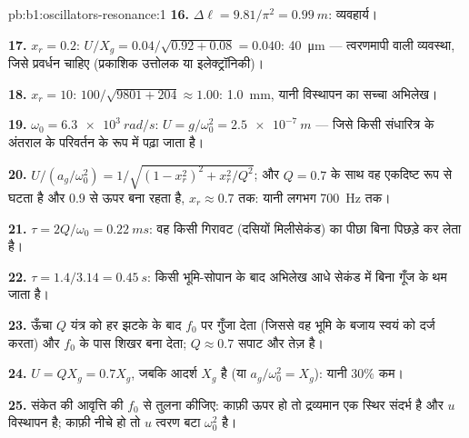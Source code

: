 \begin{solution}{pb:b1:oscillators-resonance:1}
\textbf{16.} $\Delta\ell = 9.81/\pi^2 = \qty{0.99}{m}$: व्यवहार्य।

\textbf{17.} $x_r = 0.2$: $U/X_g = 0.04/\sqrt{0.92 + 0.08} = 0.040$:
\qty{40}{\micro m} --- त्वरणमापी वाली व्यवस्था, जिसे प्रवर्धन चाहिए
(प्रकाशिक उत्तोलक या इलेक्ट्रॉनिकी)।

\textbf{18.} $x_r = 10$: $100/\sqrt{9801 + 204} \approx 1.00$: \qty{1.0}{mm},
यानी विस्थापन का सच्चा अभिलेख।

\textbf{19.} $\omega_0 = \qty{6.3e3}{rad/s}$: $U = g/\omega_0^2 = \qty{2.5e-7}{m}$
--- जिसे किसी संधारित्र के अंतराल के परिवर्तन के रूप में पढ़ा जाता है।

\textbf{20.} $U/(a_g/\omega_0^2) = 1/\sqrt{(1 - x_r^2)^2 + x_r^2/Q^2}$; और
$Q = 0.7$ के साथ वह एकदिष्ट रूप से घटता है और $0.9$ से ऊपर बना रहता है,
$x_r \approx 0.7$ तक: यानी लगभग \qty{700}{Hz} तक।

\textbf{21.} $\tau = 2Q/\omega_0 = \qty{0.22}{ms}$: वह किसी गिरावट (दसियों
मिलीसेकंड) का पीछा बिना पिछड़े कर लेता है।

\textbf{22.} $\tau = 1.4/3.14 = \qty{0.45}{s}$: किसी भूमि-सोपान के बाद
अभिलेख आधे सेकंड में बिना गूँज के थम जाता है।

\textbf{23.} ऊँचा $Q$ यंत्र को हर झटके के बाद $f_0$ पर गुँजा देता (जिससे
वह भूमि के बजाय स्वयं को दर्ज करता) और $f_0$ के पास शिखर बना देता;
$Q \approx 0.7$ सपाट और तेज़ है।

\textbf{24.} $U = QX_g = 0.7X_g$, जबकि आदर्श $X_g$ है (या $a_g/\omega_0^2
= X_g$): यानी $30\%$ कम।

\textbf{25.} संकेत की आवृत्ति की $f_0$ से तुलना कीजिए: काफ़ी ऊपर हो तो
द्रव्यमान एक स्थिर संदर्भ है और $u$ विस्थापन है; काफ़ी नीचे हो तो $u$
त्वरण बटा $\omega_0^2$ है।
\end{solution}
